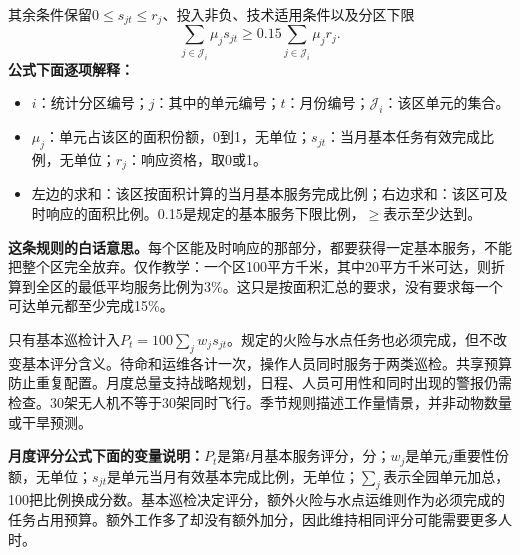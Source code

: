 \documentclass[12pt,a4paper]{article}
\numberwithin{equation}{section}
\begin{document}
其余条件保留$0\le s_{jt}\le r_j$、投入非负、技术适用条件以及分区下限
\begin{equation}
\sum_{j\in\mathcal J_i}\mu_js_{jt}\ge0.15\sum_{j\in\mathcal J_i}\mu_jr_j.
\label{eq:monthlyfloor}
\end{equation}
\noindent\textbf{公式下面逐项解释：}
\begin{itemize}
\item $i$：统计分区编号；$j$：其中的单元编号；$t$：月份编号；$\mathcal J_i$：该区单元的集合。
\item $\mu_j$：单元占该区的面积份额，0到1，无单位；$s_{jt}$：当月基本任务有效完成比例，无单位；$r_j$：响应资格，取0或1。
\item 左边的求和：该区按面积计算的当月基本服务完成比例；右边求和：该区可及时响应的面积比例。0.15是规定的基本服务下限比例，$\ge$表示至少达到。
\end{itemize}
\noindent\textbf{这条规则的白话意思。}每个区能及时响应的那部分，都要获得一定基本服务，不能把整个区完全放弃。仅作教学：一个区100平方千米，其中20平方千米可达，则折算到全区的最低平均服务比例为3\%。这只是按面积汇总的要求，没有要求每一个可达单元都至少完成15\%。

只有基本巡检计入$P_t=100\sum_jw_js_{jt}$。规定的火险与水点任务也必须完成，但不改变基本评分含义。待命和运维各计一次，操作人员同时服务于两类巡检。共享预算防止重复配置。月度总量支持战略规划，日程、人员可用性和同时出现的警报仍需检查。30架无人机不等于30架同时飞行。季节规则描述工作量情景，并非动物数量或干旱预测。

\noindent\textbf{月度评分公式下面的变量说明：}$P_t$是第$t$月基本服务评分，分；$w_j$是单元$j$重要性份额，无单位；$s_{jt}$是单元当月有效基本完成比例，无单位；$\sum_j$表示全园单元加总，100把比例换成分数。基本巡检决定评分，额外火险与水点运维则作为必须完成的任务占用预算。额外工作多了却没有额外加分，因此维持相同评分可能需要更多人时。
\end{document}
